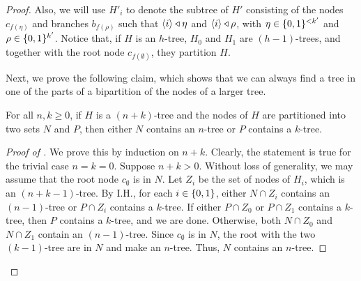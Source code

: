 \begin{theorem}
\begin{proof}
            Also, we will use $H'_i$ to denote the subtree of $H'$ consisting of the nodes $c_{f(\eta)}$ and branches
            $b_{f(\rho)}$ such that $\left< i \right> \triangleleft \eta$ and $\left< i \right> \triangleleft \rho$, with $\eta \in \{ 0,1 \}^{<k'}$
            and $\rho \in \{ 0,1 \}^{k'}$.
            Notice that, if $H$ is an $h$-tree, $H_0$ and $H_1$ are $(h-1)$-trees, and together with the root node
            $c_{f(\emptyset)}$, they partition $H$.

            Next, we prove the following claim, which shows that we can always find a tree
            in one of the parts of a bipartition of the nodes of a larger tree.

            \begin{claim} \label{clm:n_or_k_tree_in_partition_of_n_plus_k_tree}
                For all $n, k \geq 0$, if $H$ is a $(n + k)$-tree and the nodes of $H$ are partitioned into two sets $N$ and $P$,
                then either $N$ contains an $n$-tree or $P$ contains a $k$-tree.
                \begin{proof}[Proof of ]
                    We prove this by induction on $n + k$.
                    Clearly, the statement is true for the trivial case $n = k = 0$.
                    Suppose $n + k > 0$.
                    Without loss of generality, we may assume that the root node $c_\emptyset$ is in $N$.
                    Let $Z_i$ be the set of nodes of $H_i$, which is an $(n+k-1)$-tree.
                    By I.H., for each $i \in \{ 0,1 \}$, either $N \cap Z_i$ contains an $(n-1)$-tree or
                    $P \cap Z_i$ contains a $k$-tree.
                    If either $P \cap Z_0$ or $P \cap Z_1$ contains a $k$-tree, then $P$ contains a $k$-tree, and we are done.
                    Otherwise, both $N \cap Z_0$ and $N \cap Z_1$ contain an $(n-1)$-tree.
                    Since $c_\emptyset$ is in $N$, the root with the two $(k-1)$-tree are in $N$ and make an $n$-tree.
                    Thus, $N$ contains an $n$-tree.
                \end{proof}
            \end{claim}


\end{proof}
\end{theorem}
